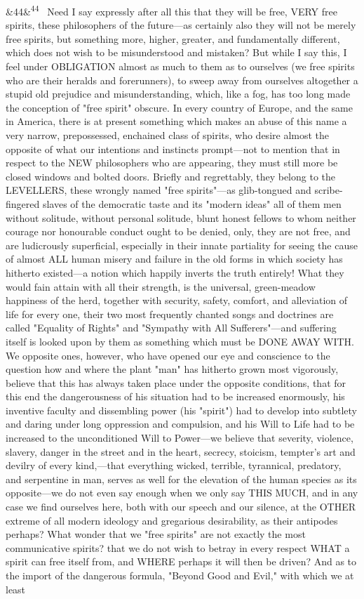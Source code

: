 \documentclass[12pt]{article}
\newcommand{\para}[1][]{\par\noindent\ifx&#1&\else\textsuperscript{\footnotesize #1}~\fi}
\begin{document}
\para[44] Need I say expressly after all this that they will be free, VERY free spirits, these philosophers of the future---as certainly also they will not be merely free spirits, but something more, higher, greater, and fundamentally different, which does not wish to be misunderstood and mistaken? But while I say this, I feel under OBLIGATION almost as much to them as to ourselves (we free spirits who are their heralds and forerunners), to sweep away from ourselves altogether a stupid old prejudice and misunderstanding, which, like a fog, has too long made the conception of "free spirit" obscure. In every country of Europe, and the same in America, there is at present something which makes an abuse of this name a very narrow, prepossessed, enchained class of spirits, who desire almost the opposite of what our intentions and instincts prompt---not to mention that in respect to the NEW philosophers who are appearing, they must still more be closed windows and bolted doors. Briefly and regrettably, they belong to the LEVELLERS, these wrongly named "free spirits"---as glib-tongued and scribe-fingered slaves of the democratic taste and its "modern ideas" all of them men without solitude, without personal solitude, blunt honest fellows to whom neither courage nor honourable conduct ought to be denied, only, they are not free, and are ludicrously superficial, especially in their innate partiality for seeing the cause of almost ALL human misery and failure in the old forms in which society has hitherto existed---a notion which happily inverts the truth entirely! What they would fain attain with all their strength, is the universal, green-meadow happiness of the herd, together with security, safety, comfort, and alleviation of life for every one, their two most frequently chanted songs and doctrines are called "Equality of Rights" and "Sympathy with All Sufferers"---and suffering itself is looked upon by them as something which must be DONE AWAY WITH. We opposite ones, however, who have opened our eye and conscience to the question how and where the plant "man" has hitherto grown most vigorously, believe that this has always taken place under the opposite conditions, that for this end the dangerousness of his situation had to be increased enormously, his inventive faculty and dissembling power (his "spirit") had to develop into subtlety and daring under long oppression and compulsion, and his Will to Life had to be increased to the unconditioned Will to Power---we believe that severity, violence, slavery, danger in the street and in the heart, secrecy, stoicism, tempter's art and devilry of every kind,---that everything wicked, terrible, tyrannical, predatory, and serpentine in man, serves as well for the elevation of the human species as its opposite---we do not even say enough when we only say THIS MUCH, and in any case we find ourselves here, both with our speech and our silence, at the OTHER extreme of all modern ideology and gregarious desirability, as their antipodes perhaps? What wonder that we "free spirits" are not exactly the most communicative spirits? that we do not wish to betray in every respect WHAT a spirit can free itself from, and WHERE perhaps it will then be driven? And as to the import of the dangerous formula, "Beyond Good and Evil," with which we at least 
\end{document}
